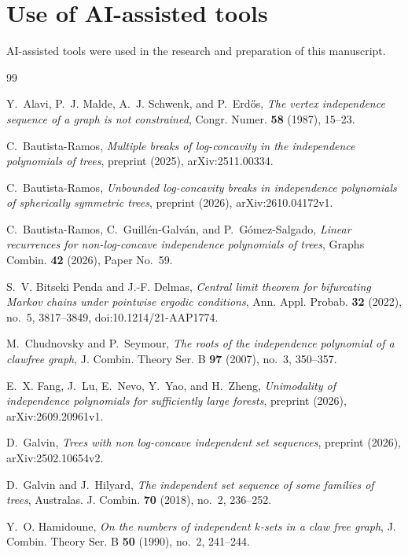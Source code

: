 \documentclass{amsart}
\theoremstyle{definition}
\theoremstyle{remark}
\numberwithin{equation}{section}
\begin{document}
\section*{Use of AI-assisted tools}

AI-assisted tools were used in the research and preparation of this manuscript.

\begin{thebibliography}{99}

Y.~Alavi, P.~J. Malde, A.~J. Schwenk, and P.~Erd\H{o}s, \emph{The vertex independence sequence of a graph is not constrained}, Congr. Numer. \textbf{58} (1987), 15--23.

C.~Bautista-Ramos, \emph{Multiple breaks of log-concavity in the independence polynomials of trees}, preprint (2025), arXiv:2511.00334.

C.~Bautista-Ramos, \emph{Unbounded log-concavity breaks in independence polynomials of spherically symmetric trees}, preprint (2026), arXiv:2610.04172v1.

C.~Bautista-Ramos, C.~Guill\'en-Galv\'an, and P.~G\'omez-Salgado, \emph{Linear recurrences for non-log-concave independence polynomials of trees}, Graphs Combin. \textbf{42} (2026), Paper No.~59.

S.~V. Bitseki Penda and J.-F. Delmas, \emph{Central limit theorem for bifurcating Markov chains under pointwise ergodic conditions}, Ann. Appl. Probab. \textbf{32} (2022), no.~5, 3817--3849, doi:10.1214/21-AAP1774.

M.~Chudnovsky and P.~Seymour, \emph{The roots of the independence polynomial of a clawfree graph}, J. Combin. Theory Ser. B \textbf{97} (2007), no.~3, 350--357.

E.~X. Fang, J.~Lu, E.~Nevo, Y.~Yao, and H.~Zheng, \emph{Unimodality of independence polynomials for sufficiently large forests}, preprint (2026), arXiv:2609.20961v1.

D.~Galvin, \emph{Trees with non log-concave independent set sequences}, preprint (2026), arXiv:2502.10654v2.

D.~Galvin and J.~Hilyard, \emph{The independent set sequence of some families of trees}, Australas. J. Combin. \textbf{70} (2018), no.~2, 236--252.

Y.~O. Hamidoune, \emph{On the numbers of independent $k$-sets in a claw free graph}, J. Combin. Theory Ser. B \textbf{50} (1990), no.~2, 241--244.


\end{thebibliography}
\end{document}
